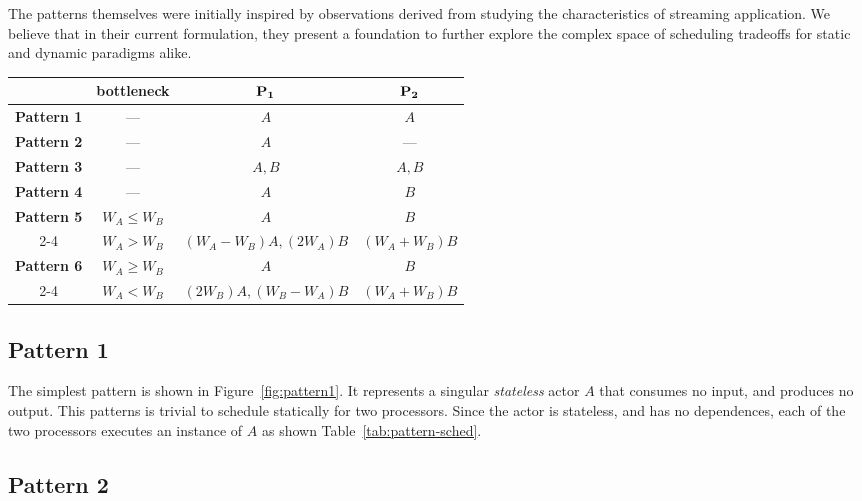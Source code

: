 The patterns themselves were initially inspired by observations
derived from studying the characteristics of streaming application. We
believe that in their current formulation, they present a foundation
to further explore the complex space of scheduling tradeoffs for
static and dynamic paradigms alike.

\begin{table*}[t]
\center
{\small
\begin{tabular}{|c|c|c|c|} \hline
                 & {\bf bottleneck} & ${\bf P_1}$  & ${\bf P_2}$ \\ \hline
{\bf Pattern 1}  & ---              & $A$     & $A$ \\ \hline
{\bf Pattern 2}  & ---              & $A$     & --- \\ \hline
{\bf Pattern 3}  & ---              & $A, B$  & $A, B$ \\ \hline
{\bf Pattern 4}  & ---              & $A$     & $B$ \\ \hline
{\bf Pattern 5}  & $W_A \le W_B$    & $A$     & $B$ \\ \cline{2-4}
                 & $W_A > W_B$      & $(W_A - W_B) A, (2W_A) B$ & $(W_A + W_B) B$ \\ \hline
{\bf Pattern 6}  & $W_A \ge W_B$    & $A$     & $B$ \\ \cline{2-4}
                 & $W_A < W_B$      & $(2W_B) A, (W_B - W_A) B$ & $(W_A + W_B) B$ \\ \hline
\end{tabular}}
\caption{\small Maximum efficiency static schedules for the stream graph patterns.}
\label{tab:pattern-sched}
\end{table*}


\subsection{Pattern 1}

The simplest pattern is shown in Figure~\ref{fig:pattern1}. It
represents a singular {\it stateless} actor $A$ that consumes no
input, and produces no output.
This patterns is trivial to schedule statically for two
processors. Since the actor is stateless, and has no dependences, each
of the two processors executes an instance of $A$ as shown Table~\ref{tab:pattern-sched}.

\subsection{Pattern 2}

